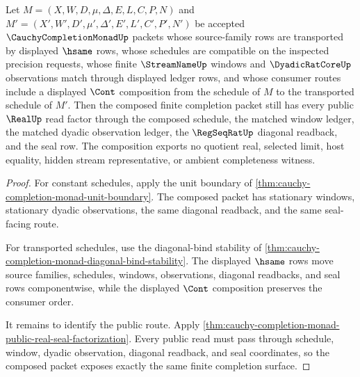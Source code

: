 \begin{theorem}
\label{thm:cauchy-completion-monad-schedule-composition-boundary}
Let $M=(X,W,D,\mu,\Delta,E,L,C,P,N)$ and $M'=(X',W',D',\mu',\Delta',E',L',C',P',N')$ be accepted $\CauchyCompletionMonadUp$ packets whose source-family rows are transported by displayed $\hsame$ rows, whose schedules are compatible on the inspected precision requests, whose finite $\StreamNameUp$ windows and $\DyadicRatCoreUp$ observations match through displayed ledger rows, and whose consumer routes include a displayed $\Cont$ composition from the schedule of $M$ to the transported schedule of $M'$. Then the composed finite completion packet still has every public $\RealUp$ read factor through the composed schedule, the matched window ledger, the matched dyadic observation ledger, the $\RegSeqRatUp$ diagonal readback, and the seal row. The composition exports no quotient real, selected limit, host equality, hidden stream representative, or ambient completeness witness.
\end{theorem}
\begin{proof}
For constant schedules, apply the unit boundary of \autoref{thm:cauchy-completion-monad-unit-boundary}. The composed packet has stationary windows, stationary dyadic observations, the same diagonal readback, and the same seal-facing route.

For transported schedules, use the diagonal-bind stability of \autoref{thm:cauchy-completion-monad-diagonal-bind-stability}. The displayed $\hsame$ rows move source families, schedules, windows, observations, diagonal readbacks, and seal rows componentwise, while the displayed $\Cont$ composition preserves the consumer order.

It remains to identify the public route. Apply \autoref{thm:cauchy-completion-monad-public-real-seal-factorization}. Every public read must pass through schedule, window, dyadic observation, diagonal readback, and seal coordinates, so the composed packet exposes exactly the same finite completion surface.
\end{proof}


